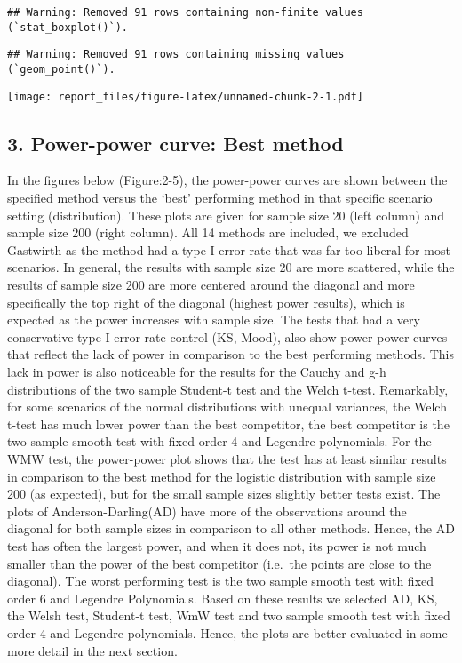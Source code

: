 \documentclass[
]{article}
\begin{document}
\begin{verbatim}
## Warning: Removed 91 rows containing non-finite values (`stat_boxplot()`).
\end{verbatim}

\begin{verbatim}
## Warning: Removed 91 rows containing missing values (`geom_point()`).
\end{verbatim}

\texttt{[image: report\_files/figure-latex/unnamed-chunk-2-1.pdf]}

\hypertarget{power-power-curve-best-method}{%
\subsection{3. Power-power curve: Best
method}\label{power-power-curve-best-method}}

In the figures below (Figure:2-5), the power-power curves are shown
between the specified method versus the `best' performing method in that
specific scenario setting (distribution). These plots are given for
sample size 20 (left column) and sample size 200 (right column). All 14
methods are included, we excluded Gastwirth as the method had a type I
error rate that was far too liberal for most scenarios. In general, the
results with sample size 20 are more scattered, while the results of
sample size 200 are more centered around the diagonal and more
specifically the top right of the diagonal (highest power results),
which is expected as the power increases with sample size. The tests
that had a very conservative type I error rate control (KS, Mood), also
show power-power curves that reflect the lack of power in comparison to
the best performing methods. This lack in power is also noticeable for
the results for the Cauchy and g-h distributions of the two sample
Student-t test and the Welch t-test. Remarkably, for some scenarios of
the normal distributions with unequal variances, the Welch t-test has
much lower power than the best competitor, the best competitor is the
two sample smooth test with fixed order 4 and Legendre polynomials. For
the WMW test, the power-power plot shows that the test has at least
similar results in comparison to the best method for the logistic
distribution with sample size 200 (as expected), but for the small
sample sizes slightly better tests exist. The plots of
Anderson-Darling(AD) have more of the observations around the diagonal
for both sample sizes in comparison to all other methods. Hence, the AD
test has often the largest power, and when it does not, its power is not
much smaller than the power of the best competitor (i.e.~the points are
close to the diagonal). The worst performing test is the two sample
smooth test with fixed order 6 and Legendre Polynomials. Based on these
results we selected AD, KS, the Welsh test, Student-t test, WmW test and
two sample smooth test with fixed order 4 and Legendre polynomials.
Hence, the plots are better evaluated in some more detail in the next
section.
\end{document}
